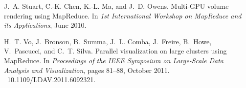 \documentclass[10pt,journal,cspaper,compsoc]{IEEEtran}
\begin{document}
\begin{thebibliography}{10}
J.~A. Stuart, C.-K. Chen, K.-L. Ma, and J.~D. Owens.
\newblock Multi-{GPU} volume rendering using {MapReduce}.
\newblock In {\em 1st International Workshop on MapReduce and its
  Applications}, June 2010.

H.~T. Vo, J.~Bronson, B.~Summa, J.~L. Comba, J.~Freire, B.~Howe, V.~Pascucci,
  and C.~T. Silva.
\newblock Parallel visualization on large clusters using {MapReduce}.
\newblock In {\em Proceedings of the IEEE Symposium on Large-Scale Data
  Analysis and Visualization}, pages 81--88, October 2011.
~10.1109/LDAV.2011.6092321.

\end{thebibliography}

%







% 
\end{document}
